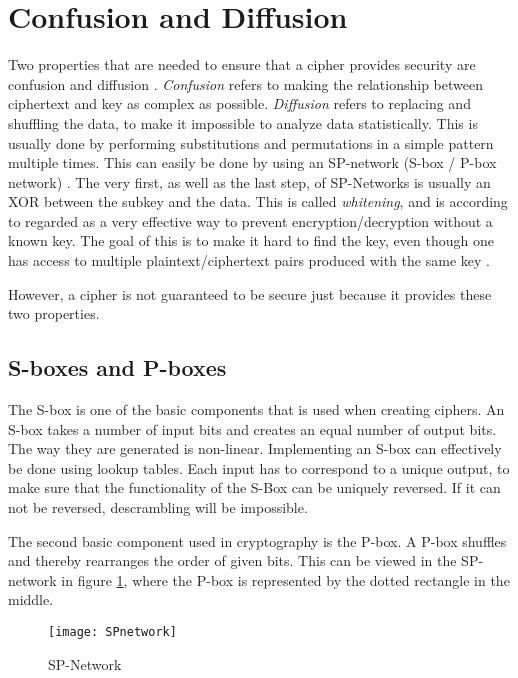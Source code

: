 \section{Confusion and Diffusion}\label{ch:ConfDiff}
Two properties that are needed to ensure that a cipher provides 
security are confusion and diffusion \citep{Shannon:1949}. 
\emph{Confusion} refers to making the relationship between ciphertext 
and key as complex as possible. \emph{Diffusion} refers to replacing 
and shuffling the data, to make it impossible to analyze data 
statistically. This is usually done by performing substitutions and 
permutations in a simple pattern multiple times. This can easily be 
done by using an SP-network (S-box / P-box network) 
\citep[pp. 74--79]{Stinson:2006}. The very first, as well as the last 
step, of SP-Networks is usually an XOR between the subkey and the data. 
This is called \emph{whitening}, and is according to 
\citet[p. 75]{Stinson:2006} regarded as a very effective way to prevent 
encryption/decryption without a known key. The goal of this is to make 
it hard to find the key, even though one has access to multiple 
plaintext/ciphertext pairs produced with the same key 
\citep{Shannon:1949}.

However, a cipher is not guaranteed to be secure just because it 
provides these two properties.

\subsection{S-boxes and P-boxes}
The S-box is one of the basic components that is used when creating 
ciphers. An S-box takes a number of input bits and creates an equal 
number of output bits. The way they are generated is non-linear. 
Implementing an S-box can effectively be done using lookup tables. 
Each input has to correspond to a unique output, to make sure that the 
functionality of the S-Box can be uniquely reversed. If it can not be 
reversed, descrambling will be impossible. 
\citep[pp. 74--75]{Stinson:2006}

The second basic component used in cryptography is the P-box. A P-box 
shuffles and thereby rearranges the order of given bits. This can be 
viewed in the SP-network in figure \ref{img:SPNetwork}, where the P-box 
is represented by the dotted rectangle in the middle.

\begin{figure}[h!]
  \begin{center}
    \texttt{[image: SPnetwork]}
    \caption{SP-Network}
    \label{img:SPNetwork}
  \end{center}
\end{figure}

